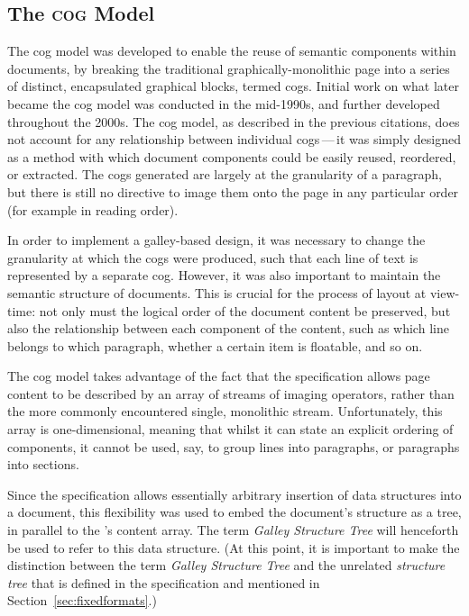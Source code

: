 \subsection{The \textsc{cog} Model}
The \gls{cog} model was developed to enable the reuse of semantic components within \pdf{} documents, by breaking the traditional graph\-i\-cal\-ly-mono\-lith\-ic \pdf{} page into a series of distinct, encapsulated graphical blocks, termed \glspl{cog}. Initial work on what later became the \gls{cog} model was conducted in the mid-1990s,\hspace{0pt}\cite{Smith1995} and further developed throughout the 2000s.\hspace{0pt}\cite{Bagley2003,Bagley2004a,Bagley2005,Macdonald2005,Bagley2006,Bagley2007} The \gls{cog} model, as described in the previous citations, does not account for any relationship between individual \glspl{cog}\,---\,it was simply designed as a method with which document components could be easily reused, reordered, or extracted. The \glspl{cog} generated are largely at the granularity of a paragraph, but there is still no directive to image them onto the page in any particular order (for example in reading order).

In order to implement a galley-based design, it was necessary to change the granularity at which the \glspl{cog} were produced, such that each line of text is represented by a separate \gls{cog}. However, it was also important to maintain the semantic structure of documents. This is crucial for the process of layout at view-time: not only must the logical order of the document content be preserved, but also the relationship between each component of the content, such as which line belongs to which paragraph, whether a certain item is floatable, and so on.

The \gls{cog} model takes advantage of the fact that the \pdf{} specification\hspace{0pt}\cite{ASI2001} allows page content to be described by an array of streams of imaging operators, rather than the more commonly encountered single, monolithic stream. Unfortunately, this array is one-di\-men\-sional, meaning that whilst it can state an explicit ordering of components, it cannot be used, say, to group lines into paragraphs, or paragraphs into sections.

Since the \pdf{} specification allows essentially arbitrary  insertion of data structures into a document, this flexibility was used to embed the document's structure as a tree, in parallel to the \pdf{}'s content array. The term \emph{Galley Structure Tree} will henceforth be used to refer to this data structure. (At this point, it is important to make the distinction between the term \emph{Galley Structure Tree} and the unrelated \emph{structure tree} that is defined in the \pdf{} specification and mentioned in Section~\ref{sec:fixedformats}.)

